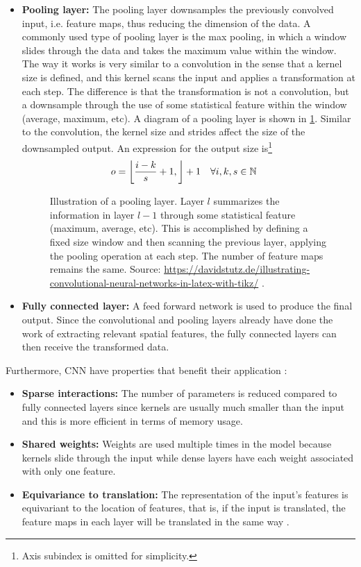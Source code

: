 \begin{itemize}
    \item \textbf{Pooling layer:} The pooling layer downsamples the previously convolved input, i.e. feature maps, thus reducing the dimension of the data. A commonly used type of pooling layer is the max pooling, in which a window slides through the data and takes the maximum value within the window. The way it works is very similar to a convolution in the sense that a kernel size is defined, and this kernel scans the input and applies a transformation at each step. The difference is that the transformation is not a convolution, but a downsample through the use of some statistical feature within the window (average, maximum, etc). A diagram of a pooling layer is shown in \ref{fig:maxpool}. Similar to the convolution, the kernel size and strides affect the size of the downsampled output. An expression for the output size is\footnote{Axis subindex is omitted for simplicity.} 
    \begin{align*}
        o &= \left\lfloor \frac{i-k}{s}+1, \right\rfloor+1 \quad \forall i,k,s \in \mathbb{N}
    \end{align*}
    \begin{figure}
	\centering
	
	\caption[Illustration of a pooling layer]{Illustration of a pooling layer. Layer $l$ summarizes the information in layer $l-1$ through some statistical feature (maximum, average, etc). This is accomplished by defining a fixed size window and then scanning the previous layer, applying the pooling operation at each step. The number of feature maps remains the same. Source: \url{https://davidstutz.de/illustrating-convolutional-neural-networks-in-latex-with-tikz/} \cite{conv-graphs}.}
	\label{fig:maxpool}
    \end{figure}
    
    \item \textbf{Fully connected layer:} A feed forward network is used to produce the final output. Since the convolutional and pooling layers already have done the work of extracting relevant spatial features, the fully connected layers can then receive the transformed data.
\end{itemize} 

Furthermore, CNN have properties that benefit their application \cite{cnn-survey}:
\begin{itemize}
    \item \textbf{Sparse interactions:} The number of parameters is reduced compared to fully connected layers since kernels are usually much smaller than the input and this is more efficient in terms of memory usage.
    \item \textbf{Shared weights:} Weights are used multiple times in the model because kernels slide through the input while dense layers have each weight associated with only one feature.
    \item \textbf{Equivariance to translation:} The representation of the input's features is equivariant to the location of features, that is, if the input is translated, the feature maps in each layer will be translated in the same way \cite{dl-book}.
\end{itemize}

